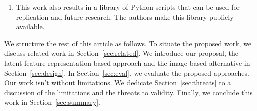 \begin{enumerate}
	\item This work also results in a library of Python scripts that can be used
		for replication and future research. The authors make this library
		publicly available. 
\end{enumerate}

We structure the rest of this article as follows. To situate the proposed work,
we discuss related work in Section~\ref{sec:related}. We introduce our
proposal, the latent feature representation based approach and the image-based
alternative in Section~\ref{sec:design}. In Section~\ref{sec:eval}, we evaluate 
the proposed approaches. Our work isn't without limitations.
We dedicate Section~\ref{sec:threats} to a discussion of the limitations and
the threats to validity. Finally, we conclude this work in
Section~\ref{sec:summary}.




